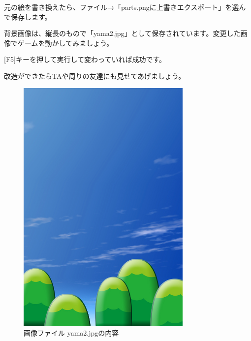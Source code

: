元の絵を書き換えたら、ファイル→「parts.pngに上書きエクスポート」を選んで保存します。
\clearpage


背景画像は、縦長のもので「yama2.jpg」として保存されています。変更した画像でゲームを動かしてみましょう。

[F5]キーを押して実行して変わっていれば成功です。

改造ができたらTAや周りの友達にも見せてあげましょう。


\begin{figure}[H]
    \begin{center}
      \includegraphics[keepaspectratio,width=8.546cm,height=12.804cm]{text04-img/text04-img032.jpg}
      \caption{画像ファイル yama2.jpgの内容}
    \end{center}
    \label{fig:prog_menu}
\end{figure}

